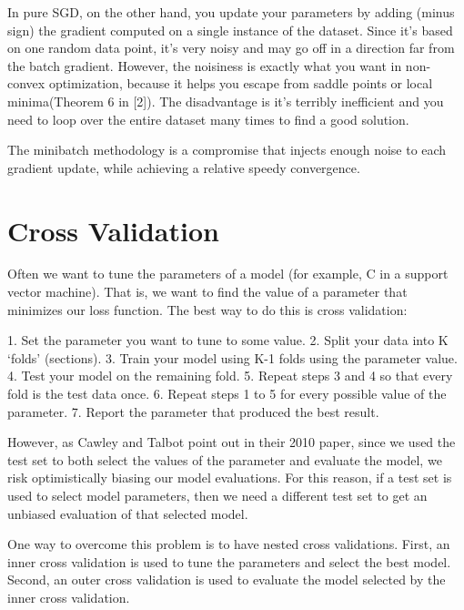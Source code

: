 In pure SGD, on the other hand, you update your parameters by adding (minus sign) the gradient computed on a single instance of the dataset. Since it's based on one random data point, it's very noisy and may go off in a direction far from the batch gradient. However, the noisiness is exactly what you want in non-convex optimization, because it helps you escape from saddle points or local minima(Theorem 6 in [2]). The disadvantage is it's terribly inefficient and you need to loop over the entire dataset many times to find a good solution.

The minibatch methodology is a compromise that injects enough noise to each gradient update, while achieving a relative speedy convergence.


\section{Cross Validation}


Often we want to tune the parameters of a model (for example, C in a support vector machine). That is, we want to find the value of a parameter that minimizes our loss function. The best way to do this is cross validation:

1. Set the parameter you want to tune to some value.
2. Split your data into K ‘folds’ (sections).
3. Train your model using K-1 folds using the parameter value.
4. Test your model on the remaining fold.
5. Repeat steps 3 and 4 so that every fold is the test data once.
6. Repeat steps 1 to 5 for every possible value of the parameter.
7. Report the parameter that produced the best result.

However, as Cawley and Talbot point out in their 2010 paper, since we used the test set to both select the values of the parameter and evaluate the model, we risk optimistically biasing our model evaluations. For this reason, if a test set is used to select model parameters, then we need a different test set to get an unbiased evaluation of that selected model.

One way to overcome this problem is to have nested cross validations. First, an inner cross validation is used to tune the parameters and select the best model. Second, an outer cross validation is used to evaluate the model selected by the inner cross validation.



